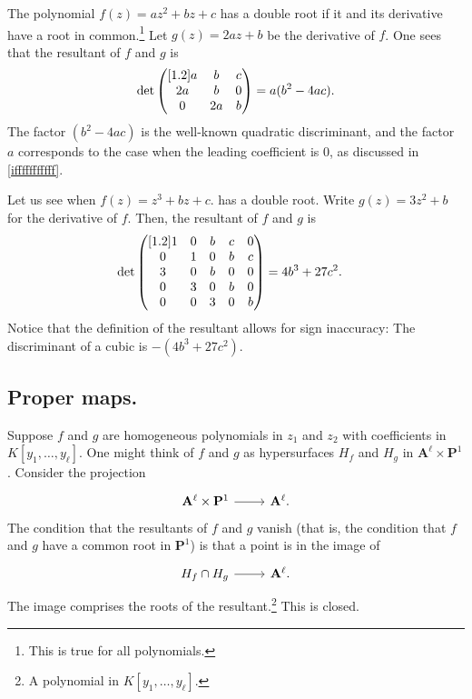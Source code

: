 \documentclass [11 pt, oneside] {article}
\begin{document}
\begin{example}[ ]\label{}\text{}
The polynomial $f(z)=az^2+bz+c$ has a double root if it and its derivative have a root in common.\footnote{This is true for all polynomials.} Let $g(z)=2az+b$ be the derivative of $f$. One sees that the resultant of $f$ and $g$ is
\begin{align*}
	\det\begin{pmatrix} [1.2] a&b&c\\2a&b&0\\0&2a&b\end{pmatrix} = a(b^2-4ac).
\end{align*}
The factor $(b^2-4ac)$ is the well-known quadratic discriminant, and the factor $a$ corresponds to the case when the leading coefficient is $0$, as discussed in \cref{ifffffffffff}.  
\end{example}

\begin{example}[ ]\label{}\text{}
Let us see when $f(z)=z^3+bz+c$. has a double root. Write $g (z)= 3z^2 + b$ for the derivative of $f$. Then, the resultant of $f$ and $g$ is
\begin{align*}
	\det\begin{pmatrix} [1.2] 1&0&b&c&0\\0&1&0&b&c\\3&0&b&0&0\\0&3&0&b&0\\0&0&3&0&b\end{pmatrix}&= 4b^3+27c^2.
\end{align*}
Notice that the definition of the resultant allows for sign inaccuracy: The discriminant of a cubic is $-(4b^3+27c^2)$.
\end{example}

\subsection{Proper maps.}
Suppose $f$ and $g$ are homogeneous polynomials in $z_1$ and $z_2$ with coefficients in $K[y_1,\hdots, y_\ell]$. One might think of $f$ and $g$ as hypersurfaces $H_f$ and $H_g$ in $\mathbf{A}^\ell\times \mathbf{P}^1$. Consider the projection 
\[
\begin{tikzcd}
\mathbf{A}^\ell\times \mathbf{P}^1\ar[r]& \mathbf{A}^\ell.
\end{tikzcd}
\]
The condition that the resultants of $f$ and $g$ vanish (that is, the condition that $f$ and $g$ have a common root in $\mathbf{P}^1$) is that a point is in the image of 
\[
\begin{tikzcd}
H_f\cap H_g\ar[r]& \mathbf{A}^\ell.
\end{tikzcd}
\] 
The image comprises the roots of the resultant.\footnote{A polynomial in $K[y_1,\hdots,y_\ell]$.} This is closed.
\end{document}

